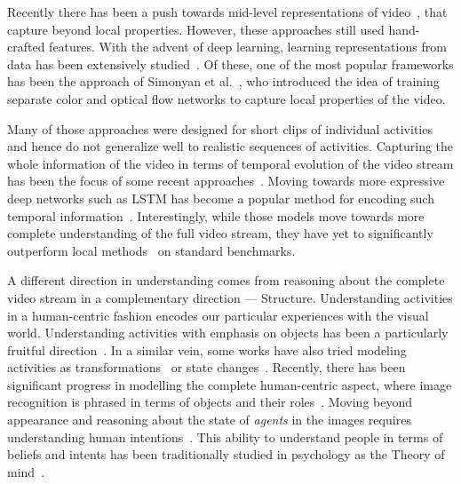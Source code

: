 \documentclass[10pt,twocolumn,letterpaper]{article}
\begin{document}
Recently there has been a push towards mid-level representations of video~\cite{Corso12,YaleS13,ArpitJ13,lan2015iccv}, that capture beyond local properties. However, these approaches still used hand-crafted features. With the advent of deep learning, learning representations from data has been extensively studied~\cite{3DCNN,Karpathy14,2stream14,TDD15,Taylor10,Tran15,Le11,Georgia15,Xu15,Vondrick16_repr,scnn_shou_wang_chang_cvpr16,Souza16}. Of these, one of the most popular frameworks has been the approach of Simonyan et al.~\cite{2stream14}, who introduced the idea of training separate color and optical flow networks to capture local properties of the video. 

Many of those approaches were designed for short clips of individual activities and hence do not generalize well to realistic sequences of activities. 
Capturing the whole information of the video in terms of temporal evolution of the video stream has been the focus of some recent approaches~\cite{KevinT12,Basura15,Izadinia12,Rohrbach12,Sun13,pirsiavash2014parsing}.
Moving towards more expressive deep networks such as LSTM has become a popular method for encoding such temporal information~\cite{Srivastava15,Donahue15,cnnlstm,Sun_2015_ICCV,Wang_Transformation,sigurdsson2016learning,yeung2015end}. Interestingly, while those models move towards more complete understanding of the full video stream, they have yet to significantly outperform local methods~\cite{2stream14} on standard benchmarks.

A different direction in understanding comes from reasoning about the complete video stream in a complementary direction --- Structure. Understanding activities in a human-centric fashion encodes our particular experiences with the visual world. Understanding activities with emphasis on objects has been a particularly fruitful direction~\cite{li2007and,ryoo2007hierarchical,gupta2009observing,prest2012weakly,Vondrick16_actns}. In a similar vein, some works have also tried modeling activities as transformations~\cite{Wang_Transformation} or state changes~\cite{Fathi13}. Recently, there has been significant progress in modelling the complete human-centric aspect, where image recognition is phrased in terms of objects and their roles~\cite{yatskarsituation,VSRL_gupta15}. Moving beyond appearance and reasoning about the state of {\em agents} in the images requires understanding human intentions~\cite{kitani2012activity,pirsiavash2014inferring}. This ability to understand people in terms of beliefs and intents has been traditionally studied in psychology as the Theory of mind~\cite{premack1978does}.
\end{document}
